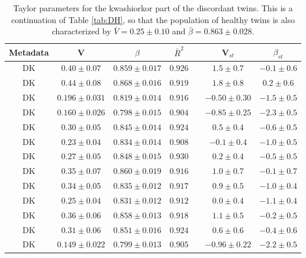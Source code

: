 \begin{table} 
  \begin{center}
    \begin{tabular}{ccccccc}
	    \hline
		Metadata&V&$\beta$&$\bar{R}^2$&&V$_{st}$&$\beta_{st}$\\
		\hline
		DK&$0.40 \pm 0.07$&$0.859 \pm 0.017$&$0.926$&&$1.5 \pm 0.7$&$-0.1 \pm 0.6$\\
		DK&$0.44 \pm 0.08$&$0.868 \pm 0.016$&$0.919$&&$1.8 \pm 0.8$&$0.2 \pm 0.6$\\
		DK&$0.196 \pm 0.031$&$0.819 \pm 0.014$&$0.916$&&$-0.50 \pm 0.30$&$-1.5 \pm 0.5$\\
		DK&$0.160 \pm 0.026$&$0.798 \pm 0.015$&$0.904$&&$-0.85 \pm 0.25$&$-2.3 \pm 0.5$\\
		DK&$0.30 \pm 0.05$&$0.845 \pm 0.014$&$0.924$&&$0.5 \pm 0.4$&$-0.6 \pm 0.5$\\
		DK&$0.23 \pm 0.04$&$0.834 \pm 0.014$&$0.908$&&$-0.1 \pm 0.4$&$-1.0 \pm 0.5$\\
		DK&$0.27 \pm 0.05$&$0.848 \pm 0.015$&$0.930$&&$0.2 \pm 0.4$&$-0.5 \pm 0.5$\\
		DK&$0.35 \pm 0.07$&$0.860 \pm 0.019$&$0.916$&&$1.0 \pm 0.7$&$-0.1 \pm 0.7$\\
		DK&$0.34 \pm 0.05$&$0.835 \pm 0.012$&$0.917$&&$0.9 \pm 0.5$&$-1.0 \pm 0.4$\\
		DK&$0.25 \pm 0.04$&$0.831 \pm 0.012$&$0.912$&&$0.0 \pm 0.4$&$-1.1 \pm 0.4$\\
		DK&$0.36 \pm 0.06$&$0.858 \pm 0.013$&$0.918$&&$1.1 \pm 0.5$&$-0.2 \pm 0.5$\\
		DK&$0.31 \pm 0.06$&$0.851 \pm 0.016$&$0.924$&&$0.6 \pm 0.6$&$-0.4 \pm 0.6$\\
		DK&$0.149 \pm 0.022$&$0.799 \pm 0.013$&$0.905$&&$-0.96 \pm 0.22$&$-2.2 \pm 0.5$\\
	    \hline
	    \hline
    \end{tabular}
  \end{center}
  \caption{Taylor parameters for the kwashiorkor part of the discordant twins\cite{kwashiorkor}. This is a continuation of Table \ref{tab:DH}, so that the population of healthy twins is also characterized by $\bar{V} = 0.25 \pm 0.10$ and $\bar{\beta} = 0.863 \pm 0.028$.}
  \label{tab:DK}
\end{table}

